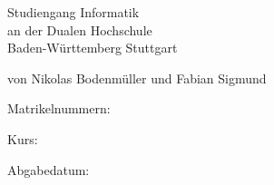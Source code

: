 \documentclass[12pt]{report}
\begin{document}
 
	
	\begin{titlepage}
		\thispagestyle{titlepage}
		\newcommand\HRule{\rule{\textwidth}{1pt}} %

		
		\begin{center}
			
			\vspace*{2cm}
			
			\begin{spacing}{2}
				{ \huge \bfseries \MakeUppercase{\meinTitel}}
			\end{spacing}
			
			\vspace*{1.5cm}
			
			\Large \artDerArbeit
			
			\vspace*{3cm}
			
			{\LARGE Studiengang Informatik}\\
			{\LARGE an der Dualen Hochschule}\\
			{\LARGE Baden-Württemberg Stuttgart}\\

			\vspace*{2.5cm}
			
			\Large von Nikolas Bodenmüller und Fabian Sigmund
			
			\large Matrikelnummern: \meineMatrikelNr  
			
			\large Kurs: \meinKurs
			
			\vspace*{1.5cm}
			
			\Large Abgabedatum: \abgabeDatum
			
			
		\end{center}
		
	\end{titlepage}



\fancypagestyle{plain}{
	\fancyfoot[L]{\meinName}
	\fancyfoot[C]{Seite \thepage\ }%
	\fancyfoot[R]{\abgabeDatum}
}

\pagestyle{plain}
\fancyhead{}

\end{document}
